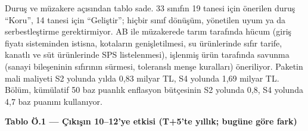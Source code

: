 Duruş ve müzakere açısından tablo sade. 33 sınıfın 19 tanesi için önerilen duruş ``Koru'', 14 tanesi için ``Geliştir''; hiçbir sınıf dönüşüm, yönetilen uyum ya da serbestleştirme gerektirmiyor. AB ile müzakerede tarım tarafında hücum (giriş fiyatı sisteminden istisna, kotaların genişletilmesi, su ürünlerinde sıfır tarife, kanatlı ve süt ürünlerinde SPS listelenmesi), işlenmiş ürün tarafında savunma (sanayi bileşeninin sıfırının sürmesi, toleranslı menşe kuralları) öneriliyor. Paketin mali maliyeti S2 yolunda yılda 0,83 milyar TL, S4 yolunda 1,69 milyar TL. Bölüm, kümülatif 50 baz puanlık enflasyon bütçesinin S2 yolunda 0,8, S4 yolunda 4,7 baz puanını kullanıyor.


\textbf{Tablo Ö.1 --- Çıkışın 10--12'ye etkisi (T+5'te yıllık; bugüne göre fark)}

\nopagebreak[4]

\begingroup\gbtablo\footnotesize

